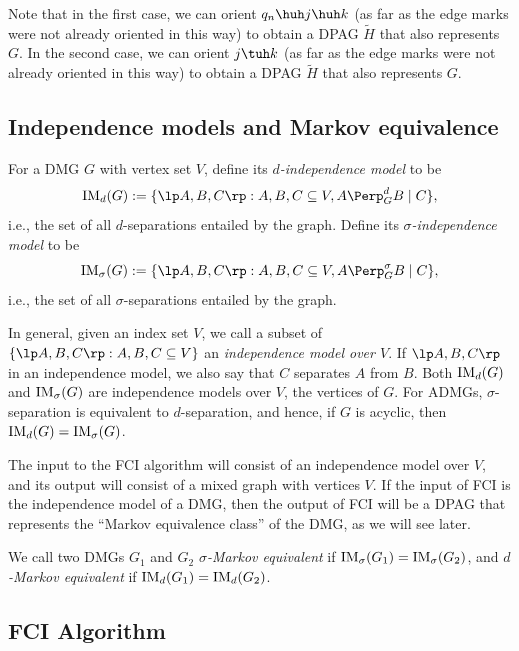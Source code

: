 Note that in the first case, we can orient $q_n \huh j \huh k$ (as far as the edge marks were not already oriented in this way) to obtain a DPAG $\tilde{H}$ that also represents $G$. 
In the second case, we can orient $j \tuh k$ (as far as the edge marks were not already oriented in this way) to obtain a DPAG $\tilde{H}$ that also represents $G$.

\subsection{Independence models and Markov equivalence}

\begin{Def}\label{def:independence_model}
  For a DMG $G$ with vertex set $V$, define its \emph{$d$-independence model} to be
  $$\IM_d(G) := \{ \lt A, B, C \rt : A, B, C \subseteq V, A \Perp_G^d B \mid C \},$$
  i.e., the set of all $d$-separations entailed by the graph. Define its
  \emph{$\sigma$-independence model} to be
  $$\IM_\sigma(G) := \{ \lt A, B, C \rt : A, B, C \subseteq V, A \Perp_G^\sigma B \mid C \},$$
  i.e., the set of all $\sigma$-separations entailed by the graph. 
\end{Def}
In general, given an index set $V$, we call a subset of 
$\{ \lt A, B, C \rt : A, B, C \subseteq V \}$
an \emph{independence model over $V$}.
If $\lt A, B, C \rt$ in an independence model, we also say that $C$ separates $A$ from $B$.
Both $\mathrm{IM}_d(G)$ and $\mathrm{IM}_\sigma(G)$ are independence models over $V$, the vertices of $G$.
For ADMGs, $\sigma$-separation is equivalent to $d$-separation, and hence, if $G$ is acyclic, then
$\mathrm{IM}_d(G) = \mathrm{IM}_\sigma(G)$.

The input to the FCI algorithm will consist of an independence model over $V$,
and its output will consist of a mixed graph with vertices $V$.
If the input of FCI is the independence model of a DMG, then the output of FCI
will be a DPAG that represents the ``Markov equivalence class'' of the DMG, as
we will see later.
\begin{Def}\label{def:Markov_equivalent}
  We call two DMGs $G_1$ and $G_2$ \emph{$\sigma$-Markov equivalent} if $\mathrm{IM}_\sigma(G_1) = \mathrm{IM}_\sigma(G_2)$,
  and \emph{$d$-Markov equivalent} if $\mathrm{IM}_d(G_1) = \mathrm{IM}_d(G_2)$.
\end{Def}

\subsection{FCI Algorithm}


